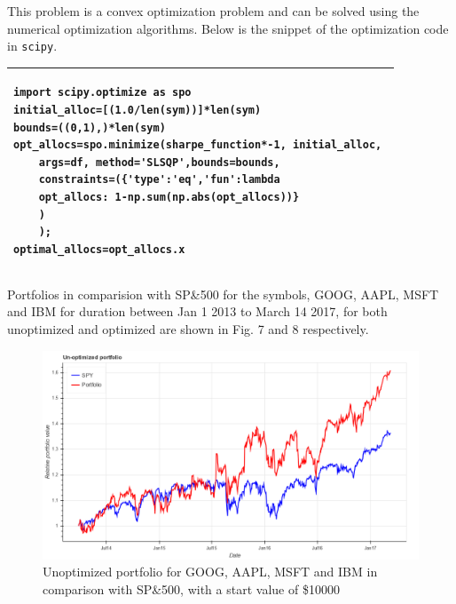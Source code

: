 \documentclass[12pt]{article}
\begin{document}
\begin{itemize}
This problem is a convex optimization problem and can be solved using the numerical optimization algorithms. Below is the snippet of the optimization code in \texttt{scipy}.

\begin{tabular}{@{}|p{12.5cm}|@{}}
\hline
\begin{verbatim}
import scipy.optimize as spo
initial_alloc=[(1.0/len(sym))]*len(sym) 
bounds=((0,1),)*len(sym) 
opt_allocs=spo.minimize(sharpe_function*-1, initial_alloc, 
	args=df, method='SLSQP',bounds=bounds,
	constraints=({'type':'eq','fun':lambda
	opt_allocs: 1-np.sum(np.abs(opt_allocs))}
	)
	); 
optimal_allocs=opt_allocs.x 
\end{verbatim}
\\
\hline
\end{tabular}


Portfolios in comparision with SP\&500 for the symbols, GOOG, AAPL, MSFT and IBM for duration between Jan 1 2013 to March 14 2017, for both unoptimized and optimized are shown in Fig. 7 and 8 respectively.


\begin{figure}[!htbp]
\label{fig:unoptimized}
\begin{center}
\includegraphics[height=0.5\textheight,width=\textwidth]{unoptimized.png}
\caption{Unoptimized portfolio for GOOG, AAPL, MSFT and IBM in comparison with SP\&500, with a start value of \$10000}
\end{center}
\end{figure}


\end{itemize}
\end{document}
